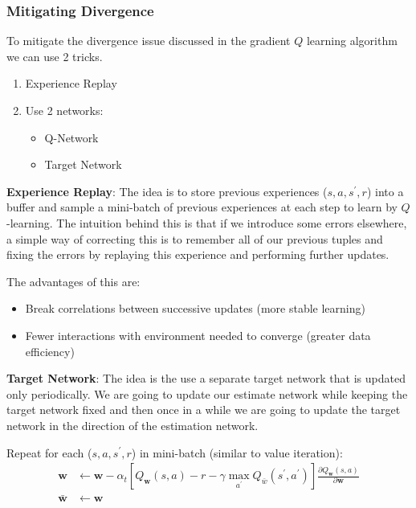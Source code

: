 \documentclass[12pt]{article}
\begin{document}
        \subsubsection{Mitigating Divergence}
            To mitigate the divergence issue discussed in the gradient $Q$ learning algorithm we can use 2 tricks. 

            \begin{enumerate}
                \item Experience Replay
                \item Use 2 networks: \begin{itemize}
                    \item Q-Network
                    \item Target Network
                \end{itemize}
            \end{enumerate}

            \textbf{Experience Replay}: The idea is to store previous experiences ($s, a, s^{\prime}, r$) into a buffer
            and sample a mini-batch of previous experiences at each step to learn by $Q$-learning. The intuition behind
            this is that if we introduce some errors elsewhere, a simple way of correcting this is to remember all of
            our previous tuples and fixing the errors by replaying this experience and performing further updates. 
            
            The advantages of this are:
            \begin{itemize}
                \item Break correlations between successive updates (more stable learning)
                \item Fewer interactions with environment needed to converge (greater data efficiency)
            \end{itemize}

            \textbf{Target Network}: The idea is the use a separate target network that is updated only periodically.
            We are going to update our estimate network while keeping the target network fixed and then once in a while
            we are going to update the target network in the direction of the estimation network.

            Repeat for each ($s, a, s^{\prime}, r$) in mini-batch (similar to value iteration):
            \begin{align*}
                \boldsymbol{w} & \leftarrow \boldsymbol{w}-\alpha_{t}\left[Q_{\boldsymbol{w}}(s, a)-r-\gamma \max
                _{a^{\prime}} Q_{\bar{w}}\left(s^{\prime}, a^{\prime}\right)\right] \frac{\partial Q_{\boldsymbol{w}}(s,
                a)}{\partial \boldsymbol{w}} \\
                \bar{\boldsymbol{w}} & \gets \boldsymbol{w}
            \end{align*}
\end{document}
